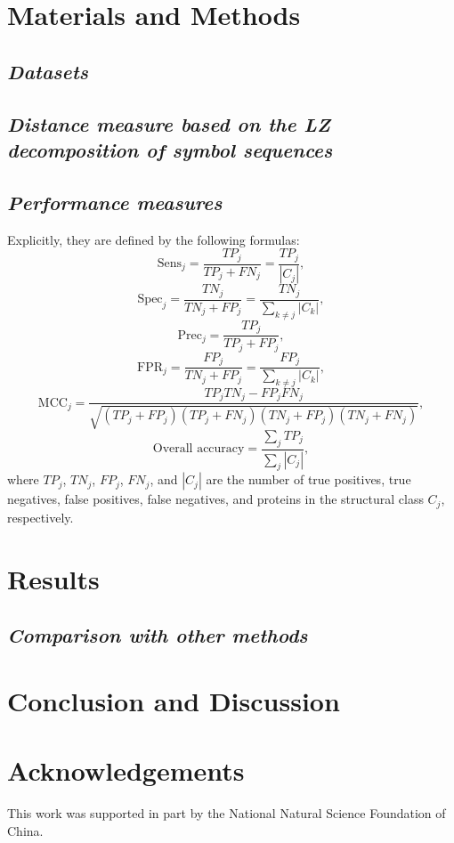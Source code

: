 \documentclass[11pt]{article}
\begin{document}
\begin{CJK*}{GBK}{song}
\section*{Materials and Methods}
\subsection*{\emph{Datasets}}   %


\subsection*{\emph{Distance measure based on the LZ decomposition of symbol sequences}}



\subsection*{\emph{Performance measures}}
Explicitly, they are defined by the following formulas:
\[\mbox{Sens}_j=\frac{TP_j}{TP_j+FN_j}=\frac{TP_j}{|C_j|},\]
\[\mbox{Spec}_j=\frac{TN_j}{TN_j+FP_j}=\frac{TN_j}{\sum_{k\neq j} |C_k|},\]
\[\mbox{Prec}_j=\frac{TP_j}{TP_j+FP_j},\]
\[\mbox{FPR}_j=\frac{FP_j}{TN_j+FP_j}=\frac{FP_j}{\sum_{k\neq j} |C_k|},\]
\[\mbox{MCC}_j=\frac{TP_jTN_j-FP_jFN_j}{\sqrt{(TP_j+FP_j)(TP_j+FN_j)(TN_j+FP_j)(TN_j+FN_j)}},\]
\[\mbox{Overall accuracy}=\frac{\sum_j TP_j}{\sum_j |C_j|},\]
where $TP_j$, $TN_j$, $FP_j$, $FN_j$, and $|C_j|$ are the number of
true positives, true negatives, false positives, false negatives,
and proteins in the structural class $C_j$, respectively.

\section*{Results}

\subsection*{\emph{Comparison with other methods}}


\section*{Conclusion and Discussion}


\section*{Acknowledgements} This work was supported in part by
the National Natural Science Foundation of China.


\end{CJK*}
\end{document}
